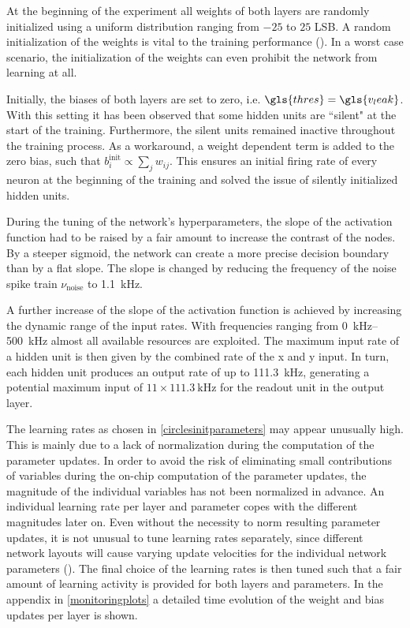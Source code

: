 At the beginning of the experiment all weights of both layers are randomly initialized using a uniform distribution ranging from $-25$ to $25$ LSB. A random initialization of the weights is vital to the training performance (\citealp{Goodfellow-et-al-2016}). In a worst case scenario, the initialization of the weights can even prohibit the network from learning at all.

Initially, the biases of both layers are set to zero, i.e. $\gls{thres} = \gls{v_leak}$. With this setting it has been observed that some hidden units are ``silent" at the start of the training. Furthermore, the silent units remained inactive throughout the training process. As a workaround, a weight dependent term is added to the zero bias, such that $b_i^\text{init} \propto \sum_j w_{ij}$. This ensures an initial firing rate of every neuron at the beginning of the training and solved the issue of silently initialized hidden units.

During the tuning of the network's hyperparameters, the slope of the activation function had to be raised by a fair amount to increase the contrast of the nodes. By a steeper sigmoid, the network can create a more precise decision boundary than by a flat slope. The slope is changed by reducing the frequency of the noise spike train $\nu_\text{noise}$ to \SI{1.1}{\kilo \Hz}. %

A further increase of the slope of the activation function is achieved by increasing the dynamic range of the input rates. With frequencies ranging from \SIrange{0}{500}{\kilo \Hz} almost all available resources are exploited. The maximum input rate of a hidden unit is then given by the combined rate of the x and y input. In turn, each hidden unit produces an output rate of up to \SI{111.3}{\kilo \Hz}, generating a potential maximum input of $11 \times \SI{111.3}{\kilo \Hz}$ for the readout unit in the output layer.

The learning rates as chosen in \cref{circlesinitparameters} may appear unusually high. This is mainly due to a lack of normalization during the computation of the parameter updates. In order to avoid the risk of eliminating small contributions of variables during the on-chip computation of the parameter updates, the magnitude of the individual variables has not been normalized in advance. An individual learning rate per layer and parameter copes with the different magnitudes later on. Even without the necessity to norm resulting parameter updates, it is not unusual to tune learning rates separately, since different network layouts will cause varying update velocities for the individual network parameters (\citealp{Goodfellow-et-al-2016}). The final choice of the learning rates is then tuned such that a fair amount of learning activity is provided for both layers and parameters. In the appendix in \cref{monitoringplots} a detailed time evolution of the weight and bias updates per layer is shown.

